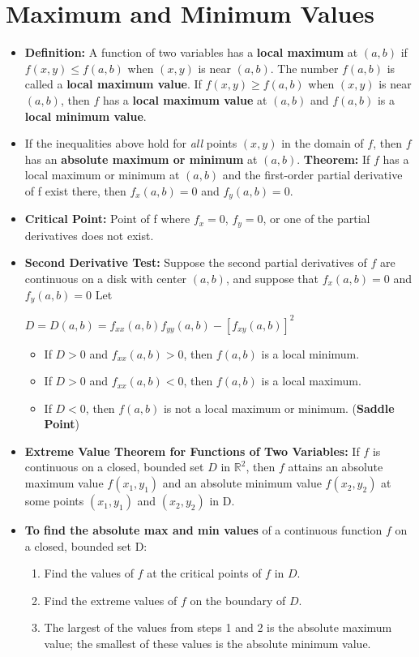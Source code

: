 \documentclass{report}
\begin{document}
	\section{Maximum and Minimum Values}
		\begin{itemize}\addtolength{\leftskip}{2em}
			\item \textbf{Definition:} A function of two variables has a \textbf{local maximum} at $(a,b)$ if $f(x,y)\le f(a,b)$ when $(x,y)$ is near $(a,b)$. The number $f(a,b)$ is called a \textbf{local maximum value}. If $f(x,y)\ge f(a,b)$ when $(x,y)$ is near $(a,b)$, then $f$ has a \textbf{local maximum value} at $(a,b)$ and $f(a,b)$ is a \textbf{local minimum value}.
			\item If the inequalities above hold for \textit{all} points $(x,y)$ in the domain of $f$, then $f$ has an \textbf{absolute maximum or minimum} at $(a,b)$.
			\textbf{Theorem: }If $f$ has a local maximum or minimum at $(a,b)$ and the first-order partial derivative of f exist there, then $f_x(a,b)=0$ and $f_y(a,b)=0$. 
			\item \textbf{Critical Point:} Point of f where $f_x=0$, $f_y=0$, or one of the partial derivatives does not exist. 
			\item \textbf{Second Derivative Test: }Suppose the second partial derivatives of $f$ are continuous on a disk with center $(a,b)$, and suppose that $f_x(a,b)=0$ and $f_y(a,b)=0$ Let 
			\begin{center}
			$D=D(a,b)=f_{xx}(a,b)f_{yy}(a,b)-[f_{xy}(a,b)]^2$
			\end{center}
			\begin{itemize}\addtolength{\leftskip}{4em}
			\item If $D>0$ and $f_{xx}(a,b)>0$, then $f(a,b)$ is a local minimum.
			\item If $D>0$ and $f_{xx}(a,b)<0$, then $f(a,b)$ is a local maximum.
			\item If $D<0$, then $f(a,b)$ is not a local maximum or minimum. (\textbf{Saddle Point})
			\end{itemize}
			\item \textbf{Extreme Value Theorem for Functions of Two Variables:} If $f$ is continuous on a closed, bounded set $D$ in $\mathbb{R}^2$, then $f$ attains an absolute maximum value $f(x_1,y_1)$ and an absolute minimum value $f(x_2,y_2)$ at some points $(x_1,y_1)$ and $(x_2,y_2)$ in D.
			\item \textbf{To find the absolute max and min values} of a continuous function $f$ on a closed, bounded set D:
			\begin{enumerate}\addtolength{\leftskip}{4em}
				\item Find the values of $f$ at the critical points of $f$ in $D$.
				\item Find the extreme values of $f$ on the boundary of $D$.
				\item The largest of the values from steps 1 and 2 is the absolute maximum value; the smallest of these values is the absolute minimum value.
			\end{enumerate}
		\end{itemize}
\end{document}
